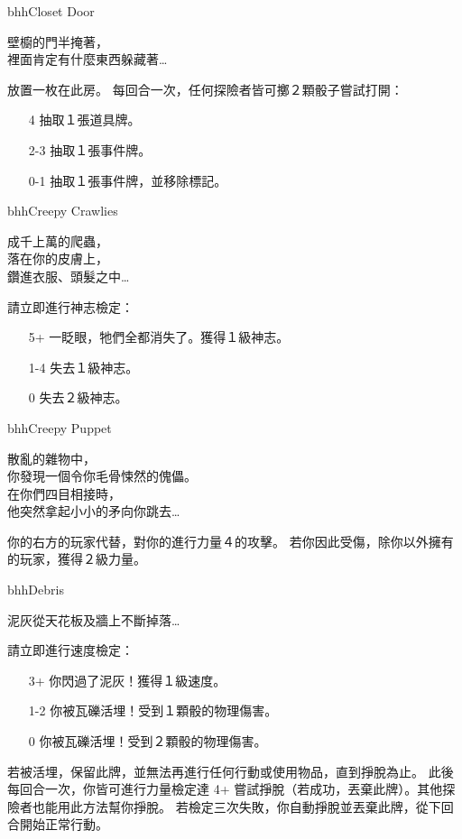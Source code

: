 \linebreak[0]%
\begin{EventCard}{bhh}{Closet Door}
	\begin{CardStory}
		壁櫥的門半掩著，\\
		裡面肯定有什麼東西躲藏著…
	\end{CardStory}
	放置一枚在此房。\smallbreak
	每回合一次，任何探險者皆可擲２顆骰子嘗試打開：
	\begin{itemize}
		\item[4] 抽取１張道具牌。
		\item[2-3] 抽取１張事件牌。
		\item[0-1] 抽取１張事件牌，並移除標記。
	\end{itemize}
\end{EventCard}%
\linebreak[0]%
\begin{EventCard}{bhh}{Creepy Crawlies}
	\begin{CardStory}
		成千上萬的爬蟲，\\
		落在你的皮膚上，\\
		鑽進衣服、頭髮之中…
	\end{CardStory}
	請立即進行神志檢定：
	\begin{itemize}
		\item[5+] 一眨眼，牠們全都消失了。獲得１級神志。
		\item[1-4] 失去１級神志。
		\item[0] 失去２級神志。
	\end{itemize}
\end{EventCard}%
\linebreak[0]%
\begin{EventCard}{bhh}{Creepy Puppet}
	\begin{CardStory}
		散亂的雜物中，\\
		你發現一個令你毛骨悚然的傀儡。\\
		在你們四目相接時，\\
		他突然拿起小小的矛向你跳去…
	\end{CardStory}
	你的右方的玩家代替\ThisName{}，對你的進行力量４的攻擊。\smallbreak
	若你因此受傷，除你以外擁有的玩家，獲得２級力量。\smallbreak
\end{EventCard}%
\linebreak[0]%
\begin{EventCard}{bhh}{Debris}
	\begin{CardStory}
		泥灰從天花板及牆上不斷掉落…
	\end{CardStory}
	\footnotesize
	請立即進行速度檢定：
	\begin{itemize}
		\item[3+] 你閃過了泥灰！獲得１級速度。
		\item[1-2] 你被瓦礫活埋！受到１顆骰的物理傷害。
		\item[0] 你被瓦礫活埋！受到２顆骰的物理傷害。
	\end{itemize}
	若被活埋，保留此牌，並無法再進行任何行動或使用物品，直到掙脫為止。\smallbreak
	此後每回合一次，你皆可進行力量檢定達 4+ 嘗試掙脫（若成功，丟棄此牌）。其他探險者也能用此方法幫你掙脫。\smallbreak
	若檢定三次失敗，你自動掙脫並丟棄此牌，從下回合開始正常行動。\smallbreak
\end{EventCard}%
